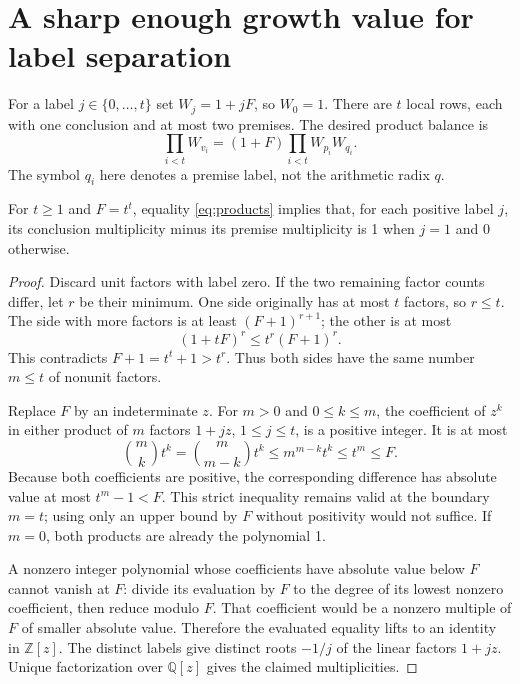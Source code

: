 \section{A sharp enough growth value for label separation}\label{sec:labels}

For a label $j\in\{0,\ldots,t\}$ set $W_j=1+jF$, so $W_0=1$.
There are $t$ local rows, each with one conclusion and at most two premises.
The desired product balance is
\begin{equation}\label{eq:products}
 \prod_{i<t}W_{v_i}=(1+F)\prod_{i<t}W_{p_i}W_{q_i}.
\end{equation}
The symbol $q_i$ here denotes a premise label, not the arithmetic radix $q$.

\begin{lemma}[Label separation at $F=t^t$]\label{lem:labels}
For $t\ge1$ and $F=t^t$, equality \eqref{eq:products} implies that, for
each positive label $j$, its conclusion multiplicity minus its premise
multiplicity is 1 when $j=1$ and 0 otherwise.
\end{lemma}
\begin{proof}
Discard unit factors with label zero. If the two remaining factor counts
differ, let $r$ be their minimum. One side originally has at most $t$
factors, so $r\le t$. The side with more factors is at least
$(F+1)^{r+1}$; the other is at most
\[
 (1+tF)^r\le t^r(F+1)^r.
\]
This contradicts $F+1=t^t+1>t^r$. Thus both sides have the same number
$m\le t$ of nonunit factors.

Replace $F$ by an indeterminate $z$. For $m>0$ and $0\le k\le m$,
the coefficient of $z^k$ in either product of $m$ factors $1+jz$,
$1\le j\le t$, is a positive integer. It is at most
\[
 \binom{m}{k}t^k
 =\binom{m}{m-k}t^k
 \le m^{m-k}t^k\le t^m\le F.
\]
Because both coefficients are positive, the corresponding difference has
absolute value at most $t^m-1<F$. This strict inequality remains valid
at the boundary $m=t$; using only an upper bound by $F$ without positivity
would not suffice. If $m=0$, both products are already the polynomial 1.

A nonzero integer polynomial whose coefficients have absolute value below
$F$ cannot vanish at $F$: divide its evaluation by $F$ to the degree of
its lowest nonzero coefficient, then reduce modulo $F$. That coefficient
would be a nonzero multiple of $F$ of smaller absolute value. Therefore
the evaluated equality lifts to an identity in $\mathbb Z[z]$.
The distinct labels give distinct roots $-1/j$ of the linear factors
$1+jz$. Unique factorization over $\mathbb Q[z]$ gives the claimed
multiplicities.
\end{proof}

